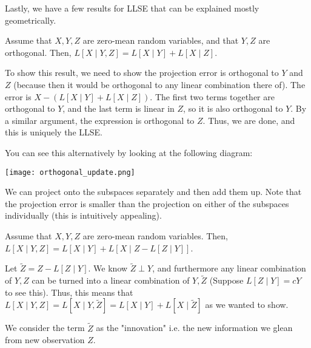Lastly, we have a few results for LLSE that can be explained mostly geometrically.

\begin{theorem} 
    Assume that $X, Y, Z$ are zero-mean random variables, and that $Y, Z$ are orthogonal. Then, $L[X \mid Y, Z] = L[X \mid Y] + L[X \mid Z]$.
    \begin{proof*}
        To show this result, we need to show the projection error is orthogonal to $Y$ and $Z$ (because then it would be orthogonal to any linear combination there of).
        The error is $X - (L[X \mid Y] + L[X \mid Z])$. The first two terms together are orthogonal to $Y$, and the last term is linear in $Z$, so it is also orthogonal to $Y$.
        By a similar argument, the expression is orthogonal to $Z$. Thus, we are done, and this is uniquely the LLSE.
    \end{proof*}
\end{theorem}

You can see this alternatively by looking at the following diagram:

\texttt{[image: orthogonal\_update.png]}

We can project onto the subspaces separately and then add them up. Note that the projection error is smaller than the projection on either of the subspaces individually (this is intuitively appealing).

\begin{theorem}
    Assume that $X, Y, Z$ are zero-mean random variables. Then, $L[X \mid Y, Z] = L[X \mid Y] + L[X \mid Z -  L[Z \mid Y]]$.
    \begin{proof*}
        Let $\tilde{Z} = Z - L[Z \mid Y]$.
        We know $\tilde{Z} \perp Y$, and furthermore any linear combination of $Y, Z$ can be turned into a linear combination of $Y, \tilde{Z}$ (Suppose $L[Z \mid Y] = cY$ to see this).
        Thus, this means that $L[X \mid Y, Z] = L[X \mid Y, \tilde{Z}] = L[X \mid Y] + L[X \mid \tilde{Z}]$ as we wanted to show.
    \end{proof*}
\end{theorem}

We consider the term $\tilde{Z}$ as the "innovation" i.e. the new information we glean from new observation $Z$.
